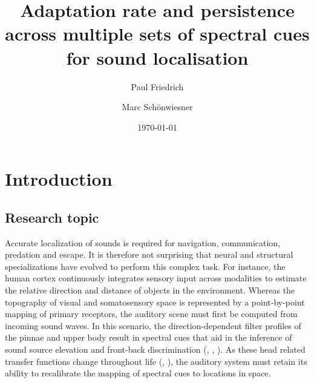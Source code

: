 \documentclass[preprint]{JASA}
\begin{document}
\title[JASA/Sample JASA Article]{Adaptation rate and persistence across multiple sets of spectral cues for sound localisation}

\author{Paul Friedrich}

\author{Marc Schönwiesner}


\date{\today} 

\begin{abstract}

\end{abstract}

\maketitle










\section{\label{sec:1} Introduction}
\subsection{Research topic}
Accurate localization of sounds is required for navigation, communication, predation and escape. It is therefore not surprising that neural and structural specializations have evolved to perform this complex task. For instance, the human cortex continuously integrates sensory input across modalities to estimate the relative direction and distance of objects in the environment. Whereas the topography of visual and somatosensory space is represented by a point‐by‐point mapping of primary receptors, the auditory scene must first be computed from incoming sound waves. In this scenario, the direction-dependent filter profiles of the pinnae and upper body  result in spectral cues that aid in the inference of sound source elevation and front-back discrimination (\citet{blauert_sound_1969},  \citet{middlebrooks_narrow-band_1992}, \citet{baumgartner_modeling_2014}). As these head related transfer functions change throughout life (\citet{keen_growth_1988}, \citet{otte_age-related_2013}), the auditory system must retain its ability to recalibrate the mapping of spectral cues to locations in space. 
\end{document}
